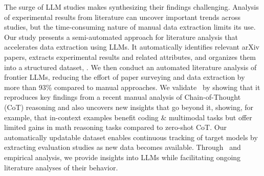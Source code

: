 The surge of LLM studies makes synthesizing their findings challenging. 
Analysis of experimental results from literature can uncover important trends across studies, but the time-consuming nature of manual data extraction limits its use.
Our study presents a semi-automated approach for literature analysis that accelerates data extraction using LLMs.
It automatically identifies relevant arXiv papers, extracts experimental results and related attributes, and organizes them into a structured dataset, \datasetname.
We then conduct an automated literature analysis of frontier LLMs, reducing the effort of paper surveying and data extraction by more than 93\% compared to manual approaches.
We validate \datasetname~by showing that it reproduces key findings from a recent manual analysis of Chain-of-Thought (CoT) reasoning and also uncovers new insights that go beyond it, showing, for example, that in-context examples benefit coding \& multimodal tasks but offer limited gains in math reasoning tasks compared to zero-shot CoT.
Our automatically updatable dataset enables continuous tracking of target models by extracting evaluation studies as new data becomes available. 
Through \datasetname~and empirical analysis, we provide insights into LLMs while facilitating ongoing literature analyses of their behavior.